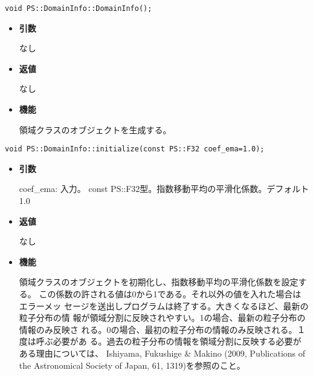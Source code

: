 
\begin{screen}
\begin{verbatim}
void PS::DomainInfo::DomainInfo();
\end{verbatim}
\end{screen}

\begin{itemize}

\item {\bf 引数}

なし

\item {\bf 返値}

なし

\item {\bf 機能}

領域クラスのオブジェクトを生成する。

\end{itemize}


\begin{screen}
\begin{verbatim}
void PS::DomainInfo::initialize(const PS::F32 coef_ema=1.0);
\end{verbatim}
\end{screen}

\begin{itemize}

\item {\bf 引数}

coef\_ema: 入力。 const PS::F32型。指数移動平均の平滑化係数。デフォルト1.0

\item {\bf 返値}

なし

\item {\bf 機能}

領域クラスのオブジェクトを初期化し、指数移動平均の平滑化係数を設定する。
この係数の許される値は0から1である。それ以外の値を入れた場合はエラーメッ
セージを送出しプログラムは終了する。大きくなるほど、最新の粒子分布の情
報が領域分割に反映されやすい。1の場合、最新の粒子分布の情報のみ反映さ
れる。0の場合、最初の粒子分布の情報のみ反映される。１度は呼ぶ必要があ
る。過去の粒子分布の情報を領域分割に反映する必要がある理由については、
Ishiyama, Fukushige \& Makino (2009, Publications of the Astronomical
Society of Japan, 61, 1319)を参照のこと。

\end{itemize}


